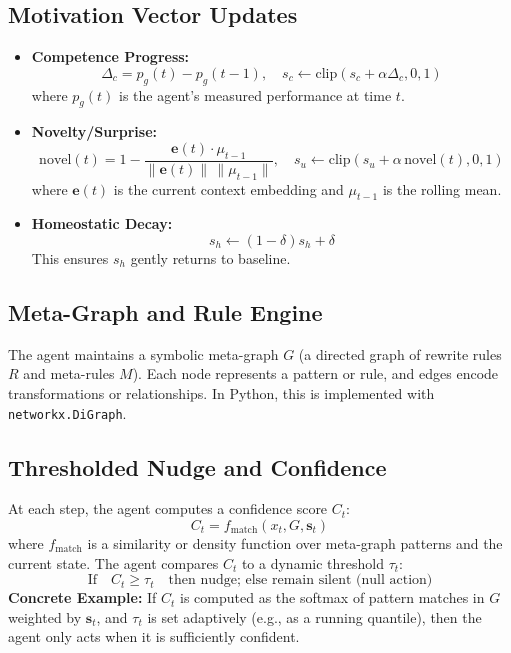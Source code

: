 \documentclass[11pt]{article}
\begin{document}
\subsection{Motivation Vector Updates}
\begin{itemize}
  \item \textbf{Competence Progress:}
  \[
    \Delta_c = p_g(t) - p_g(t-1), \quad s_c \leftarrow \mathrm{clip}(s_c + \alpha \Delta_c, 0, 1)
  \]
  where $p_g(t)$ is the agent's measured performance at time $t$.
  \item \textbf{Novelty/Surprise:}
  \[
    \mathrm{novel}(t) = 1 - \frac{\mathbf{e}(t) \cdot \mu_{t-1}}{\|\mathbf{e}(t)\|\,\|\mu_{t-1}\|}, \quad s_u \leftarrow \mathrm{clip}(s_u + \alpha\,\mathrm{novel}(t), 0, 1)
  \]
  where $\mathbf{e}(t)$ is the current context embedding and $\mu_{t-1}$ is the rolling mean.
  \item \textbf{Homeostatic Decay:}
  \[
    s_h \leftarrow (1-\delta)s_h + \delta
  \]
  This ensures $s_h$ gently returns to baseline.
\end{itemize}

\subsection{Meta-Graph and Rule Engine}
The agent maintains a symbolic meta-graph $G$ (a directed graph of rewrite rules $R$ and meta-rules $M$). Each node represents a pattern or rule, and edges encode transformations or relationships. In Python, this is implemented with \texttt{networkx.DiGraph}.

\subsection{Thresholded Nudge and Confidence}
At each step, the agent computes a confidence score $C_t$:
\[
  C_t = f_\mathrm{match}(x_t, G, \mathbf{s}_t)
\]
where $f_\mathrm{match}$ is a similarity or density function over meta-graph patterns and the current state. The agent compares $C_t$ to a dynamic threshold $\tau_t$:
\[
  \text{If}\quad C_t \geq \tau_t\quad \text{then nudge; else remain silent (null action)}
\]
\textbf{Concrete Example:} If $C_t$ is computed as the softmax of pattern matches in $G$ weighted by $\mathbf{s}_t$, and $\tau_t$ is set adaptively (e.g., as a running quantile), then the agent only acts when it is sufficiently confident.
\end{document}
